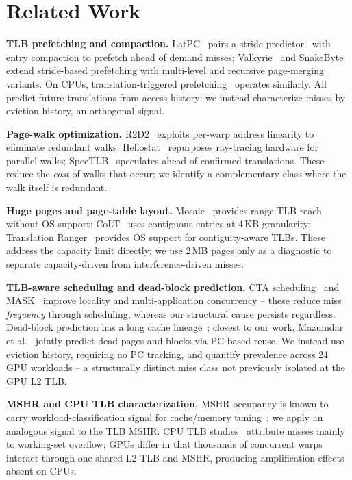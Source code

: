 \section{Related Work}
\label{sec:related}

\noindent\textbf{TLB prefetching and compaction.} LatPC~\cite{latpc} pairs a
stride predictor~\cite{kandiraju_distance} with entry compaction to prefetch
ahead of demand misses; Valkyrie~\cite{valkyrie} and SnakeByte~\cite{snakebyte}
extend stride-based prefetching with multi-level and recursive page-merging
variants. On CPUs, translation-triggered prefetching~\cite{bhattacharjee_ttp}
operates similarly. All predict future translations from access history; we
instead characterize misses by eviction history, an orthogonal signal.

\noindent\textbf{Page-walk optimization.} R2D2~\cite{r2d2} exploits per-warp
address linearity to eliminate redundant walks; Heliostat~\cite{heliostat}
repurposes ray-tracing hardware for parallel walks; SpecTLB~\cite{pham_spectlb}
speculates ahead of confirmed translations. These reduce the \emph{cost} of
walks that occur; we identify a complementary class where the walk itself is
redundant.

\noindent\textbf{Huge pages and page-table layout.} Mosaic~\cite{mosaic}
provides range-TLB reach without OS support; CoLT~\cite{colt} uses contiguous
entries at 4\,KB granularity; Translation Ranger~\cite{translation_ranger}
provides OS support for contiguity-aware TLBs. These address the capacity
limit directly; we use 2\,MB pages only as a diagnostic to separate
capacity-driven from interference-driven misses.

\noindent\textbf{TLB-aware scheduling and dead-block prediction.} CTA
scheduling~\cite{cta_schedule} and MASK~\cite{avoiding_tlb} improve locality
and multi-application concurrency -- these reduce miss \emph{frequency}
through scheduling, whereas our structural cause persists regardless.
Dead-block prediction has a long cache lineage~\cite{rrip,hawkeye}; closest to
our work, Mazumdar et al.~\cite{dop_hpca21} jointly predict dead pages and
blocks via PC-based reuse. We instead use eviction history, requiring no PC
tracking, and quantify prevalence across 24 GPU workloads -- a structurally
distinct miss class not previously isolated at the GPU L2 TLB.

\noindent\textbf{MSHR and CPU TLB characterization.} MSHR occupancy is known
to carry workload-classification signal for cache/memory
tuning~\cite{mshr_mgmt}; we apply an analogous signal to the TLB MSHR. CPU TLB
studies~\cite{translation_cpu} attribute misses mainly to working-set
overflow; GPUs differ in that thousands of concurrent warps interact through
one shared L2 TLB and MSHR, producing amplification effects absent on CPUs.
